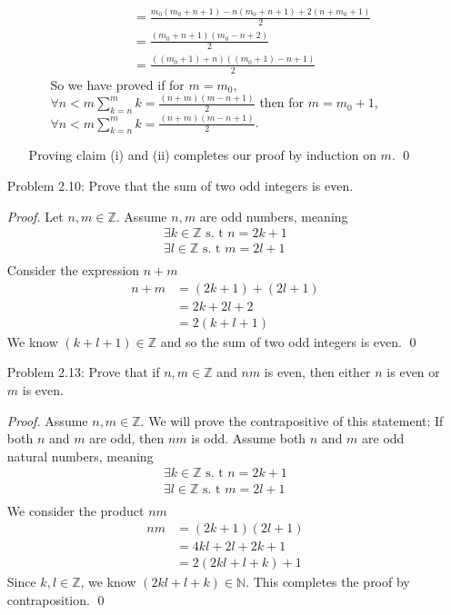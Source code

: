 \documentclass{article}
\begin{document}
\begin{enumerate}
\begin{enumerate}
\begin{enumerate}
\begin{align*}
                            & = \frac{m_0(m_0 + n + 1) - n(m_0 + n + 1) + 2(n + m_0 + 1)}{2}\\
                            & = \frac{(m_0 + n + 1)(m_0 - n + 2)}{2}\\
                            & = \frac{((m_0 + 1) + n)((m_0 + 1) -n + 1)}{2}
                        \end{align*}
                        So we have proved if for $m = m_0$, $\forall n < m \sum\limits_{k=n}^m k = \frac{(n+m)(m-n+1)}{2}$ then for $m = m_0 + 1$, $\forall n < m \sum\limits_{k=n}^m k = \frac{(n+m)(m-n+1)}{2}$.
                \end{enumerate}
                Proving claim (i) and (ii) completes our proof by induction on $m$. \qed
        \end{enumerate}
    \item[Problem 2.10:] Prove that the sum of two odd integers is even.
    \item[] \emph{Proof.} Let $n, m \in \mathbb{Z}$. Assume $n ,m$ are odd numbers, meaning
        \begin{gather*}
            \exists k \in \mathbb{Z} \text{ s. t } n = 2k + 1\\
            \exists l \in \mathbb{Z} \text{ s. t } m = 2l + 1\\
        \end{gather*}
        Consider the expression $n + m$
        \begin{align*}
            n + m &= (2k + 1) + (2l + 1)\\
            & = 2k + 2l + 2\\
            & = 2(k + l + 1)
        \end{align*}
        We know $(k + l + 1) \in \mathbb{Z}$ and so the sum of two odd integers is even. \qed
    \item[Problem 2.13:] Prove that if $n, m \in \mathbb{Z}$ and $nm$ is even, then either $n$ is even or $m$ is even.
    \item[] \emph{Proof.} Assume $n, m \in \mathbb{Z} $. We will prove the contrapositive of this statement: If both $n$ and $m$ are odd, then $nm$ is odd.
        Assume both $n$ and $m$ are odd natural numbers, meaning
        \begin{gather*}
            \exists k \in \mathbb{Z} \text{ s. t } n = 2k + 1\\
            \exists l \in \mathbb{Z} \text{ s. t } m = 2l + 1\\
        \end{gather*}
        We consider the product $nm$
        \begin{align*}
            nm &= (2k + 1)(2l + 1)\\
            & = 4kl + 2l + 2k + 1\\
            & = 2(2kl + l + k) + 1
        \end{align*}
        Since $k, l \in \mathbb{Z}$, we know $(2kl + l + k) \in \mathbb{N}$.
        This completes the proof by contraposition. \qed
\end{enumerate}
\end{document}
